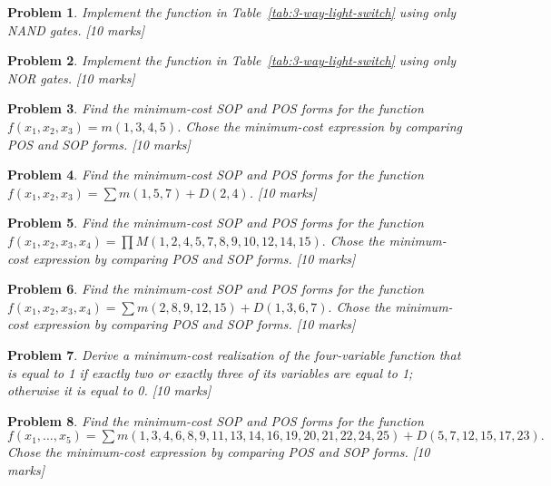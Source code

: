\documentclass[twocolumn]{article}
\newtheorem{prob}{Problem}
\begin{document}
\begin{prob}
 Implement the function in Table~\ref{tab:3-way-light-switch} using only NAND
 gates. [10 marks]
\end{prob}

\begin{prob}
 Implement the function in Table~\ref{tab:3-way-light-switch} using only NOR
 gates. [10 marks]
\end{prob}


\begin{prob}
Find the minimum-cost SOP and POS forms for the function $f(x_1 , x_2 , x_3 ) =
m(1, 3, 4, 5)$.  Chose the minimum-cost expression by comparing POS and SOP forms. [10 marks]
\label{prob:237}
\end{prob}

\begin{prob}
Find the minimum-cost SOP and POS forms for the function $f(x_1 , x_2 , x_3) =
\sum m(1, 5, 7) + D(2, 4)$.  [10 marks]
\end{prob}

\begin{prob}
Find the minimum-cost SOP and POS forms for the function $f(x_1 , x_2 , x_3,
x_4) = \prod M(1, 2, 4, 5, 7, 8, 9, 10, 12, 14, 15).$  Chose the minimum-cost
expression by comparing POS and SOP forms. [10 marks]
\end{prob}

\begin{prob}
Find the minimum-cost SOP and POS forms for the function $f(x_1 , x_2 , x_3, x_4) =
\sum m(2, 8, 9, 12, 15) + D(1, 3, 6, 7).$  Chose the minimum-cost expression
by comparing POS and SOP forms. [10 marks]
\end{prob}

\begin{prob}
Derive a minimum-cost realization of the four-variable function that is equal to 1 if exactly
two or exactly three of its variables are equal to 1; otherwise it is equal to
0.  [10 marks]
\end{prob}

\begin{prob}
  Find the minimum-cost SOP and POS forms for the function $f(x_1 , \dots, x_5) =
  \sum m(1, 3, 4, 6, 8, 9, 11, 13, 14, 16, 19, 20, 21, 22, 24, 25) + D(5, 7,
  12, 15, 17, 23).$  Chose the minimum-cost expression by comparing POS and SOP forms. [10 marks]
\end{prob}
\end{document}
